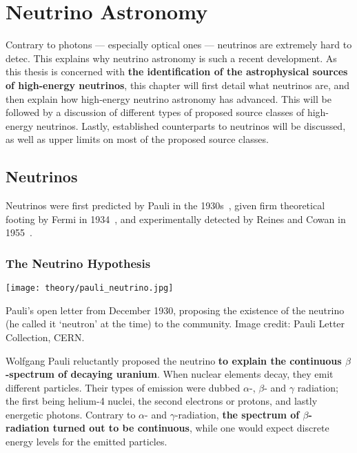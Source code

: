\chapter{Neutrino Astronomy}\label{theory}

Contrary to photons --- especially optical ones --- neutrinos are extremely hard to detec. This explains why neutrino astronomy is such a recent development. As this thesis is concerned with \textbf{the identification of the astrophysical sources of high-energy neutrinos}, this chapter will first detail what neutrinos are, and then explain how high-energy neutrino astronomy has advanced. This will be followed by a discussion of different types of proposed source classes of high-energy neutrinos. Lastly, established counterparts to neutrinos will be discussed, as well as upper limits on most of the proposed source classes.

\section{Neutrinos}
Neutrinos were first predicted by Pauli in the 1930s~, given firm theoretical footing by Fermi in 1934~, and experimentally detected by Reines and Cowan in 1955~.

\subsection{The Neutrino Hypothesis}\label{neutrino_hypothesis}

\begin{marginfigure}
    \texttt{[image: theory/pauli\_neutrino.jpg]}
    \caption[Pauli's letter proposing the neutrino]{Pauli's open letter from December 1930, proposing the existence of the neutrino (he called it `neutron' at the time) to the community. Image credit: Pauli Letter Collection, CERN.}
\end{marginfigure}

Wolfgang Pauli reluctantly proposed the neutrino \textbf{to explain the continuous $\beta$-spectrum of decaying uranium}. When nuclear elements decay, they emit different particles. Their types of emission were dubbed $\alpha$-, $\beta$- and $\gamma$ radiation; the first being helium-4 nuclei, the second electrons or protons, and lastly energetic photons. Contrary to $\alpha$- and $\gamma$-radiation, \textbf{the spectrum of $\beta$-radiation turned out to be continuous}, while one would expect discrete energy levels for the emitted particles.

